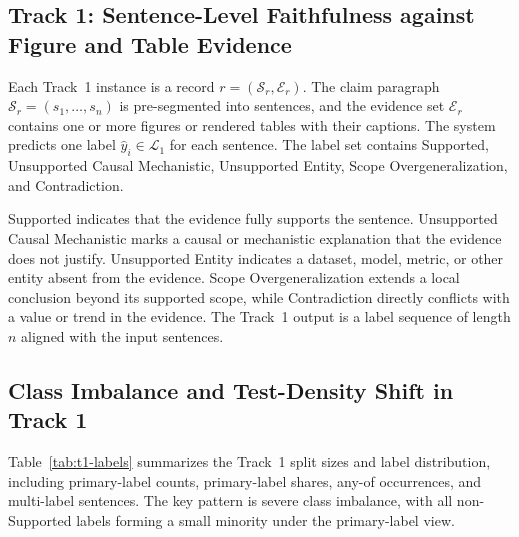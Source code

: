\documentclass[runningheads]{llncs}
\newcommand{\lab}[1]{\textsf{\small #1}}
\begin{document}
\subsection{Track 1: Sentence-Level Faithfulness against Figure and Table Evidence}
Each Track~1 instance is a record $r=(\mathcal{S}_r,\mathcal{E}_r)$. The claim paragraph $\mathcal{S}_r=(s_1,\ldots,s_n)$ is pre-segmented into sentences, and the evidence set $\mathcal{E}_r$ contains one or more figures or rendered tables with their captions. The system predicts one label $\hat{y}_i\in\mathcal{L}_1$ for each sentence. The label set contains \lab{Supported}, \lab{Unsupported Causal Mechanistic}, \lab{Unsupported Entity}, \lab{Scope Overgeneralization}, and \lab{Contradiction}.

\lab{Supported} indicates that the evidence fully supports the sentence. \lab{Unsupported Causal Mechanistic} marks a causal or mechanistic explanation that the evidence does not justify. \lab{Unsupported Entity} indicates a dataset, model, metric, or other entity absent from the evidence. \lab{Scope Overgeneralization} extends a local conclusion beyond its supported scope, while \lab{Contradiction} directly conflicts with a value or trend in the evidence. The Track~1 output is a label sequence of length $n$ aligned with the input sentences.

\subsection{Class Imbalance and Test-Density Shift in Track 1}
\label{sec:t1-data}
Table~\ref{tab:t1-labels} summarizes the Track~1 split sizes and label distribution, including primary-label counts, primary-label shares, any-of occurrences, and multi-label sentences. The key pattern is severe class imbalance, with all non-\lab{Supported} labels forming a small minority under the primary-label view.
\end{document}
